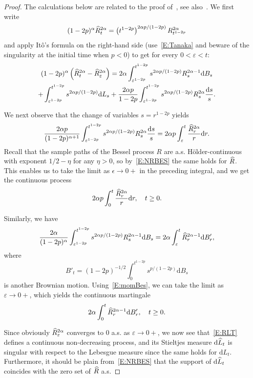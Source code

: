 \documentclass[AHL,Unicode,longabstracts,published]{cedram}
\renewcommand{\hat}[1]{\widehat{#1}}
\newcommand{\dd}{\mathrm{d}}
\let\oldhat\hat
\renewcommand*{\hat}[1]{\mathchoice{\widehat{#1}}{\widehat{#1}}{\oldhat{#1}}{\oldhat{#1}}}
\begin{document}
\begin{proof}
The calculations below are related to the proof of~\cite[Proposition~2.1]{HY}, see also~\cite[Exercise~6.11]{CY}. We first write
\[
(1-2p)^{\alpha} \hat R^{2\alpha}_t = \left(t^{1-2p}\right)^{2\alpha p/(1-2p)} R^{2\alpha}_{t^{1-2p}}
\]
and apply Itô's formula on the right-hand side (use~\eqref{E:Tanaka} and beware of the singularity at the initial time when $p<0$) to get for every $0<\varepsilon<t$:
\begin{multline*}
(1-2p)^{\alpha} \left(\hat R^{2\alpha}_t - \hat R^{2\alpha}_{\varepsilon} \right)
=  2\alpha \int_{\varepsilon^{1-2p}}^{t^{1-2p}} s^{2\alpha p/(1-2p)} R^{2\alpha-1}_s \dd B_s\\
+ \int_{\varepsilon^{1-2p}}^{t^{1-2p}} s^{2\alpha p/(1-2p)} \dd {L}_s + \frac {2\alpha p}{1-2p} \int_{\varepsilon^{1-2p}}^{t^{1-2p}} s^{2\alpha p/(1-2p)} R^{2\alpha}_s \frac{\dd s}{s}.
\end{multline*}


We next observe that the change of variables $s=r^{1-2p}$ yields
\[
\frac {2\alpha p}{(1-2p)^{\alpha+1}} \int_{\varepsilon^{1-2p}}^{t^{1-2p}} s^{2\alpha p/(1-2p)} R^{2\alpha}_s \frac{\dd s}{s}= 2\alpha p \int_{\varepsilon}^{t} \frac{\hat R^{2\alpha}_r}{r} \dd r.
\]
Recall that the sample paths of the Bessel process $R$ are a.s. H\"older-continuous with exponent $1/2-\eta$ for any $\eta>0$, so by~\eqref{E:NRBES} the same holds for $\hat R$. This enables us to take the limit as $\epsilon\to 0+$ in the preceding integral, and we get the continuous process
\[
2\alpha p \int_{0}^{t} \frac{\hat R^{2\alpha}_r}{r} \dd r, \quad t\geq 0.
\]

Similarly, we have
\[
\frac {2\alpha }{(1-2p)^{\alpha}} \int_{\varepsilon^{1-2p}}^{t^{1-2p}} s^{2\alpha p/(1-2p)} R^{2\alpha-1}_s \dd B_s= 2\alpha \int_{\varepsilon}^{t} \hat R^{2\alpha-1}_r \dd B'_r,
\]
where
\begin{equation}\label{E:B'}
B'_t= (1-2p)^{-1/2} \int_0^{t^{1-2p}} s^{p/(1-2p)} \dd B_{s}
\end{equation}
is another Brownian motion. Using~\eqref{E:momBes}, we can take the limit as $\varepsilon\to 0+$, which yields the continuous martingale
\[
2\alpha \int_{0}^{t} \hat R^{2\alpha-1}_r \dd B'_r,\quad t\geq 0.
\]

Since obviously $ \hat R^{2\alpha}_{\varepsilon}$ converges to $0$ a.s. as $\varepsilon \to 0+$, we now see that~\eqref{E:RLT} defines a continuous non-decreasing process, and its Stieltjes measure $\dd \hat{L}_t$ is singular with respect to the Lebesgue measure since the same holds for $\dd {L}_t$. Furthermore, it should be plain from~\eqref{E:NRBES} that the support of $\dd \hat{L}_t$ coincides with the zero set of $\hat R$ a.s.
\end{proof}
\end{document}
